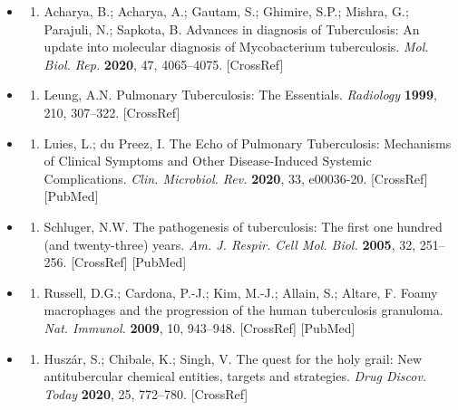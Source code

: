 \documentclass{article}
\begin{document}
\begin{itemize}
\begin{enumerate}
\end{enumerate}

\item \begin{enumerate}
\item 
Acharya, B.; Acharya, A.; Gautam, S.; Ghimire, S.P.; Mishra, G.; Parajuli, N.; Sapkota, B. Advances in diagnosis of Tuberculosis: An update into molecular diagnosis of Mycobacterium tuberculosis. \textit{Mol. Biol. Rep.} \textbf{2020}, 47, 4065–4075. [CrossRef]

\end{enumerate}

\item \begin{enumerate}
\item 
Leung, A.N. Pulmonary Tuberculosis: The Essentials. \textit{Radiology} \textbf{1999}, 210, 307–322. [CrossRef]

\end{enumerate}

\item \begin{enumerate}
\item 
Luies, L.; du Preez, I. The Echo of Pulmonary Tuberculosis: Mechanisms of Clinical Symptoms and Other Disease-Induced Systemic Complications. \textit{Clin. Microbiol. Rev.} \textbf{2020}, 33, e00036-20. [CrossRef] [PubMed]

\end{enumerate}

\item \begin{enumerate}
\item 
Schluger, N.W. The pathogenesis of tuberculosis: The first one hundred (and twenty-three) years. \textit{Am. J. Respir. Cell Mol. Biol.} \textbf{2005}, 32, 251–256. [CrossRef] [PubMed]

\end{enumerate}

\item \begin{enumerate}
\item 
Russell, D.G.; Cardona, P.-J.; Kim, M.-J.; Allain, S.; Altare, F. Foamy macrophages and the progression of the human tuberculosis granuloma. \textit{Nat. Immunol.} \textbf{2009}, 10, 943–948. [CrossRef] [PubMed]

\end{enumerate}

\item \begin{enumerate}
\item 
Huszár, S.; Chibale, K.; Singh, V. The quest for the holy grail: New antitubercular chemical entities, targets and strategies. \textit{Drug Discov. Today} \textbf{2020}, 25, 772–780. [CrossRef]


\end{enumerate}
\end{itemize}
\end{document}

